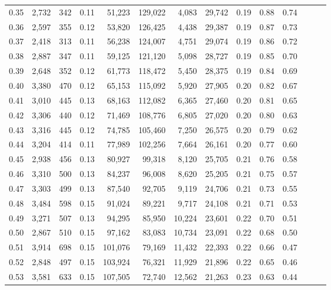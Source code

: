 \begin{tabular}{rrrrrrrrrrrrrr}
0.35 &  2,732 &  342 &  0.11 &   51,223 &  129,022 &   4,083 &  29,742 &  0.19 &  0.88 &      0.74 \\
0.36 &  2,597 &  355 &  0.12 &   53,820 &  126,425 &   4,438 &  29,387 &  0.19 &  0.87 &      0.73 \\
0.37 &  2,418 &  313 &  0.11 &   56,238 &  124,007 &   4,751 &  29,074 &  0.19 &  0.86 &      0.72 \\
0.38 &  2,887 &  347 &  0.11 &   59,125 &  121,120 &   5,098 &  28,727 &  0.19 &  0.85 &      0.70 \\
0.39 &  2,648 &  352 &  0.12 &   61,773 &  118,472 &   5,450 &  28,375 &  0.19 &  0.84 &      0.69 \\
0.40 &  3,380 &  470 &  0.12 &   65,153 &  115,092 &   5,920 &  27,905 &  0.20 &  0.82 &      0.67 \\
0.41 &  3,010 &  445 &  0.13 &   68,163 &  112,082 &   6,365 &  27,460 &  0.20 &  0.81 &      0.65 \\
0.42 &  3,306 &  440 &  0.12 &   71,469 &  108,776 &   6,805 &  27,020 &  0.20 &  0.80 &      0.63 \\
0.43 &  3,316 &  445 &  0.12 &   74,785 &  105,460 &   7,250 &  26,575 &  0.20 &  0.79 &      0.62 \\
0.44 &  3,204 &  414 &  0.11 &   77,989 &  102,256 &   7,664 &  26,161 &  0.20 &  0.77 &      0.60 \\
0.45 &  2,938 &  456 &  0.13 &   80,927 &   99,318 &   8,120 &  25,705 &  0.21 &  0.76 &      0.58 \\
0.46 &  3,310 &  500 &  0.13 &   84,237 &   96,008 &   8,620 &  25,205 &  0.21 &  0.75 &      0.57 \\
0.47 &  3,303 &  499 &  0.13 &   87,540 &   92,705 &   9,119 &  24,706 &  0.21 &  0.73 &      0.55 \\
0.48 &  3,484 &  598 &  0.15 &   91,024 &   89,221 &   9,717 &  24,108 &  0.21 &  0.71 &      0.53 \\
0.49 &  3,271 &  507 &  0.13 &   94,295 &   85,950 &  10,224 &  23,601 &  0.22 &  0.70 &      0.51 \\
0.50 &  2,867 &  510 &  0.15 &   97,162 &   83,083 &  10,734 &  23,091 &  0.22 &  0.68 &      0.50 \\
0.51 &  3,914 &  698 &  0.15 &  101,076 &   79,169 &  11,432 &  22,393 &  0.22 &  0.66 &      0.47 \\
0.52 &  2,848 &  497 &  0.15 &  103,924 &   76,321 &  11,929 &  21,896 &  0.22 &  0.65 &      0.46 \\
0.53 &  3,581 &  633 &  0.15 &  107,505 &   72,740 &  12,562 &  21,263 &  0.23 &  0.63 &      0.44 \\

\end{tabular}
